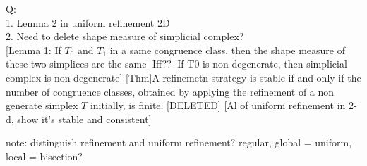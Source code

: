 \documentclass{article}
\begin{document}
    Q:\\
    1. Lemma 2 in uniform refinement 2D\\
    2. Need to delete shape measure of simplicial complex?\\
   

    [Lemma 1: If $T_0$ and $T_1$ in a same congruence class, then the shape measure of these two simplices are the same] Iff??
    [If T0 is non degenerate, then simplicial complex is non degenerate]
    [Thm]A refinemetn strategy is stable if and only if the number of congruence classes, obtained by applying the refinement of a non generate simplex $T$ initially, is finite. [DELETED]
    [Al of uniform refinement in 2-d, show it's stable and consistent]

    note: distinguish refinement and uniform refinement? regular, global = uniform, local = bisection?



\end{document}
